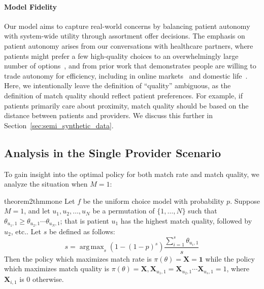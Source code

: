 \documentclass[11pt]{article}
\DeclareMathOperator*{\argmax}{arg\,max}
\begin{document}
\paragraph{Model Fidelity} 
Our model aims to capture real-world concerns by balancing patient autonomy with system-wide utility through assortment offer decisions. 
The emphasis on patient autonomy arises from our conversations with healthcare partners, where patients might prefer a few high-quality choices to an overwhelmingly large number of options~\citep{choice_overload}, and from prior work that demonstrates people are willing to trade autonomy for efficiency, including in online markets~\citep{autonomy_efficiency} and domestic life~\citep{india_efficiency_autonomy}. 
Here, we intentionally leave the definition of ``quality'' ambiguous, as the definition of match quality should reflect patient preferences.  
For example, if patients primarily care about proximity, match quality should be based on the distance between patients and providers. 
We discuss this further in Section~\ref{sec:semi_synthetic_data}. 

\subsection{Analysis in the Single Provider Scenario}
\label{sec:greedy_provider}
To gain insight into the optimal policy for both match rate and match quality, we analyze the situation when $M=1$: 

\begin{restatable}{theorem2}{thmmone}
\label{thm:one_m}
    Let $f$ be the uniform choice model with probability $p$.
    Suppose $M=1$, and let $u_{1},u_{2},\ldots,u_{N}$ be a permutation of $\{1,\ldots,N\}$ such that $\theta_{u_{1},1} \geq \theta_{u_{2},1} \cdots \theta_{u_{N},1}$; that is patient $u_{1}$ has the highest match quality, followed by $u_{2}$, etc..
    Let $s$ be defined as follows:
    \begin{equation}
       s = \argmax_{s} (1-(1-p)^{s}) \frac{\sum_{i=1}^{s} \theta_{u_{i},1}}{s}
    \end{equation}
    Then the policy which maximizes match rate is $\pi(\theta) = \mathbf{X} = \mathbf{1}$ while the policy which maximizes match quality is $\pi(\theta) =  \mathbf{X}, \mathbf{X}_{u_{1},1} = \mathbf{X}_{u_{2},1} \cdots \mathbf{X}_{u_{s},1} = 1$, where $\mathbf{X}_{i,1}$ is 0 otherwise. 
\end{restatable}
\end{document}
